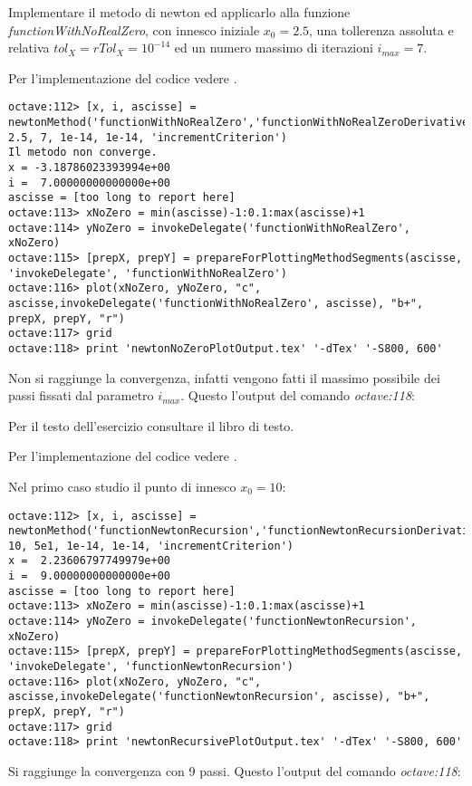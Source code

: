 \begin{exercise}
Implementare il metodo di newton ed applicarlo alla funzione \emph{functionWithNoRealZero},
con innesco iniziale $x_{0} = 2.5$, una tollerenza assoluta e relativa
$tol_{X} = rTol_{X} = 10^{-14}$ ed un numero massimo di iterazioni
$i_{max} = 7$.
\end{exercise}
Per l'implementazione del codice vedere .
\begin{lstlisting}
octave:112> [x, i, ascisse] =
newtonMethod('functionWithNoRealZero','functionWithNoRealZeroDerivative', 2.5, 7, 1e-14, 1e-14, 'incrementCriterion') 
Il metodo non converge.
x = -3.18786023393994e+00
i =  7.00000000000000e+00
ascisse = [too long to report here]
octave:113> xNoZero = min(ascisse)-1:0.1:max(ascisse)+1
octave:114> yNoZero = invokeDelegate('functionWithNoRealZero', xNoZero)
octave:115> [prepX, prepY] = prepareForPlottingMethodSegments(ascisse, 'invokeDelegate', 'functionWithNoRealZero')
octave:116> plot(xNoZero, yNoZero, "c", ascisse,invokeDelegate('functionWithNoRealZero', ascisse), "b+", prepX, prepY, "r")
octave:117> grid
octave:118> print 'newtonNoZeroPlotOutput.tex' '-dTex' '-S800, 600'
\end{lstlisting}
Non si raggiunge la convergenza, infatti vengono fatti il massimo possibile
dei passi fissati dal parametro $i_{max}$. Questo l'output del comando \emph{octave:118}:
\begin{center}

\end{center}

\begin{exercise}[2.4]
Per il testo dell'esercizio consultare il libro di testo.
\end{exercise}
Per l'implementazione del codice vedere .

Nel primo caso studio il punto di innesco $x_{0} = 10$:
\begin{lstlisting}
octave:112> [x, i, ascisse] =
newtonMethod('functionNewtonRecursion','functionNewtonRecursionDerivative', 10, 5e1, 1e-14, 1e-14, 'incrementCriterion') 
x =  2.23606797749979e+00
i =  9.00000000000000e+00
ascisse = [too long to report here]
octave:113> xNoZero = min(ascisse)-1:0.1:max(ascisse)+1
octave:114> yNoZero = invokeDelegate('functionNewtonRecursion', xNoZero)
octave:115> [prepX, prepY] = prepareForPlottingMethodSegments(ascisse, 'invokeDelegate', 'functionNewtonRecursion')
octave:116> plot(xNoZero, yNoZero, "c", ascisse,invokeDelegate('functionNewtonRecursion', ascisse), "b+", prepX, prepY, "r")
octave:117> grid
octave:118> print 'newtonRecursivePlotOutput.tex' '-dTex' '-S800, 600'
\end{lstlisting}
Si raggiunge la convergenza con 9 passi. Questo l'output del comando
\emph{octave:118}:
\begin{center}

\end{center}

